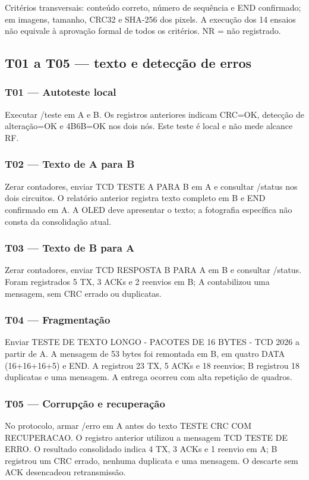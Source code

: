 {\small Critérios transversais: conteúdo correto, número de sequência e END confirmado; em imagens, tamanho, CRC32 e SHA-256 dos pixels. A execução dos 14 ensaios não equivale à aprovação formal de todos os critérios. NR = não registrado.\par}
\setcounter{subsection}{0}\subsection{T01 a T05 — texto e detecção de erros}
\subsubsection*{T01 — Autoteste local}
Executar /teste em A e B. Os registros anteriores indicam CRC=OK, detecção de alteração=OK e 4B6B=OK nos dois nós. Este teste é local e não mede alcance RF.

\subsubsection*{T02 — Texto de A para B}
Zerar contadores, enviar TCD TESTE A PARA B em A e consultar /status nos dois circuitos. O relatório anterior registra texto completo em B e END confirmado em A. A OLED deve apresentar o texto; a fotografia específica não consta da consolidação atual.

\subsubsection*{T03 — Texto de B para A}
Zerar contadores, enviar TCD RESPOSTA B PARA A em B e consultar /status. Foram registrados 5 TX, 3 ACKs e 2 reenvios em B; A contabilizou uma mensagem, sem CRC errado ou duplicatas.

\subsubsection*{T04 — Fragmentação}
Enviar TESTE DE TEXTO LONGO - PACOTES DE 16 BYTES - TCD 2026 a partir de A. A mensagem de 53 bytes foi remontada em B, em quatro DATA (16+16+16+5) e END. A registrou 23 TX, 5 ACKs e 18 reenvios; B registrou 18 duplicatas e uma mensagem. A entrega ocorreu com alta repetição de quadros.

\subsubsection*{T05 — Corrupção e recuperação}
No protocolo, armar /erro em A antes do texto TESTE CRC COM RECUPERACAO. O registro anterior utilizou a mensagem TCD TESTE DE ERRO. O resultado consolidado indica 4 TX, 3 ACKs e 1 reenvio em A; B registrou um CRC errado, nenhuma duplicata e uma mensagem. O descarte sem ACK desencadeou retransmissão.


